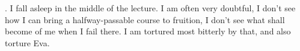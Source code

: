 
. I fall asleep in the middle of the lecture. I am often very doubtful, I don't see how I can bring a halfway-passable course to fruition, I don't see what shall become of me when I fail there. I am tortured most bitterly by that, and also torture Eva. \missing

